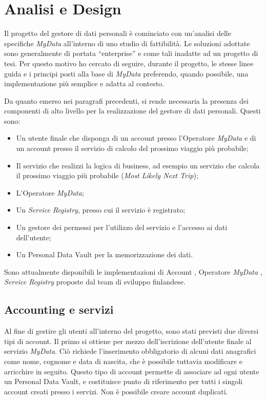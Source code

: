 \chapter{Analisi e Design}
\label{capitolo4}
\thispagestyle{empty}

\noindent Il progetto del gestore di dati personali \`e cominciato con un’analisi delle specifiche \textit{MyData} all’interno di uno studio di fattibilit\`a. Le soluzioni adottate sono generalmente di portata “enterprise” e come tali inadatte ad un progetto di tesi. Per questo motivo ho cercato di seguire, durante il progetto, le stesse linee guida e i principi posti alla base di \textit{MyData} preferendo, quando possibile, una implementazione pi\`u semplice e adatta al contesto.

Da quanto emerso nei paragrafi precedenti, si rende necessaria la presenza dei componenti di alto livello per la realizzazione del gestore di dati personali. Questi sono:
\begin{itemize}
	\item Un utente finale che disponga di un account presso l’Operatore \textit{MyData} e di un account presso il servizio di calcolo del prossimo viaggio pi\`u probabile;
	\item Il servizio che realizzi la logica di business, ad esempio un servizio che calcola il prossimo viaggio pi\`u probabile (\textit{Most Likely Next Trip});
	\item L’Operatore \textit{MyData};
	\item Un \textit{Service Registry}, presso cui il servizio \`e registrato;
	\item Un gestore dei permessi per l’utilizzo del servizio e l’accesso ai dati dell’utente;
	\item Un Personal Data Vault per la memorizzazione dei dati.
\end{itemize}

Sono attualmente disponibili le implementazioni  di Account \cite{githubmydataaccount}, Operatore \textit{MyData} \cite{githubmydataoperator}, \textit{Service Registry} \cite{githubmydataserviceregistry} proposte dal team di sviluppo finlandese.

\section{Accounting e servizi}
Al fine di gestire gli utenti all’interno del progetto, sono stati previsti due diversi tipi di account. Il primo si ottiene per mezzo dell’iscrizione dell’utente finale al servizio \textit{MyData}. Ci\`o richiede l’inserimento obbligatorio di alcuni dati anagrafici come nome, cognome e data di nascita, che \`e possibile tuttavia modificare e arricchire in seguito. Questo tipo di account permette di associare ad ogni utente un Personal Data Vault, e costituisce punto di riferimento per tutti i singoli account creati presso i servizi. Non \`e possibile creare account duplicati.

